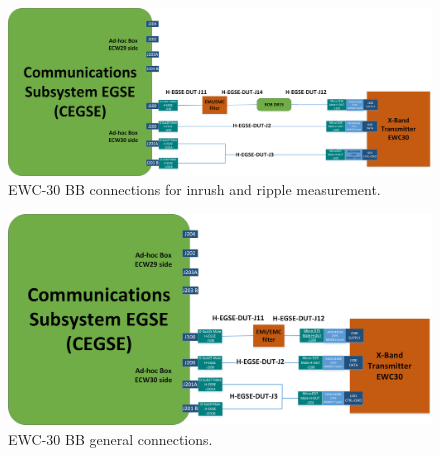 \begin{figure}[H]
	\centering
	  \includegraphics[width=.9\linewidth]{figuras/CEGSE_EWC30SetupA.png}  
	  \caption{EWC-30 BB connections for inrush and ripple measurement.}
	\label{fig:ewc30_bb_ripple}
\end{figure}

\begin{figure}[H]
	\centering
	  \includegraphics[width=.7\linewidth]{figuras/CEGSE_EWC30SetupB.png}  
	  \caption{EWC-30 BB general connections.}
	\label{fig:ewc30_bb}
\end{figure}

